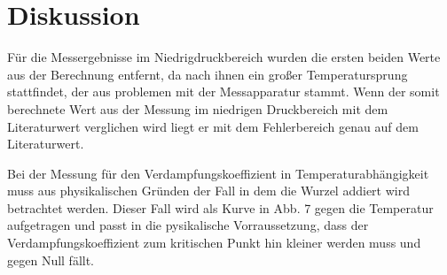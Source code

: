 \section{Diskussion}
\label{sec:Diskussion}
Für die Messergebnisse im Niedrigdruckbereich wurden die ersten beiden Werte aus der Berechnung entfernt, da nach ihnen ein großer Temperatursprung stattfindet, der aus problemen mit der Messapparatur stammt.
Wenn der somit berechnete Wert aus der Messung im niedrigen Druckbereich mit dem Literaturwert verglichen wird liegt er mit dem Fehlerbereich genau auf dem Literaturwert.

Bei der Messung für den Verdampfungskoeffizient in Temperaturabhängigkeit muss aus physikalischen Gründen der Fall in dem die Wurzel addiert wird betrachtet werden.
Dieser Fall wird als Kurve in Abb. 7 gegen die Temperatur aufgetragen und passt in die pysikalische Vorraussetzung, dass der Verdampfungskoeffizient zum kritischen Punkt hin kleiner werden muss und gegen Null fällt.